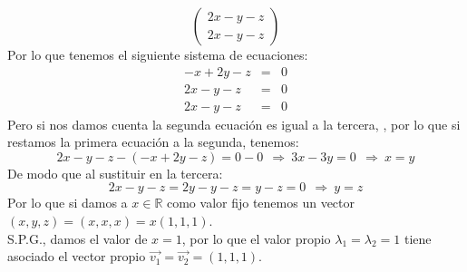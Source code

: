 \begin{itemize}
\begin{itemize}
\[\begin{pmatrix}
2x-y-z\\2x-y-z\end{pmatrix}\]
Por lo que tenemos el siguiente sistema de ecuaciones:
\begin{eqnarray*}
-x+2y-z&=&0\\
2x-y-z&=&0\\2x-y-z&=&0
\end{eqnarray*}
Pero si nos damos cuenta la segunda ecuaci\'on es igual a la tercera,
, por lo que si restamos la primera ecuaci\'on a la segunda, tenemos:
\[2x-y-z-(-x+2y-z)=0-0~~\Longrightarrow~3x-3y=0~~\Longrightarrow~x=y\]
De modo que al sustituir en la tercera:
\[2x-y-z=2y-y-z=y-z=0~~\Longrightarrow~y=z\]Por lo que si damos a $x\in\mathbb{R}$ como valor fijo tenemos un vector $(x,y,z)=(x,x,x)=x(1,1,1)$.\\
S.P.G., damos el valor de $x=1$, por lo que el valor propio $\lambda_1=\lambda_2=1$ tiene asociado el vector propio $\vec{v_1}=\vec{v_2}=(1,1,1)$.



\end{itemize}
\end{itemize}
